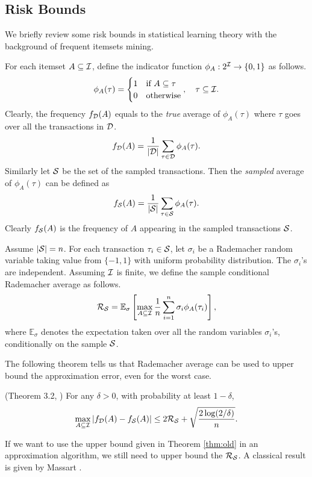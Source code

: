 \documentclass{article}
\begin{document}
\subsection{Risk Bounds}
\label{sec:rb}
\newcommand{\R}{\mathcal{R}}
We briefly review some risk bounds in statistical learning theory \cite{BBL05} with the background of frequent itemsets mining. 

For each itemset $A\subseteq\mathcal{I}$, define the indicator function $\phi_A : 2^{\mathcal{I}} \to \{0, 1\}$ as follows.
$$\phi_A(\tau) = \begin{cases}
1 & \textrm{if $A\subseteq \tau$}\\
0 & \textrm{otherwise}\\
\end{cases},\quad
\tau\subseteq\mathcal{I}.$$
Clearly, the frequency $f_{\mathcal{D}}(A)$ equals to the \emph{true} average of $\phi_A(\tau)$ where $\tau$ goes over all the transactions in $\mathcal{D}$.
$$f_{\mathcal{D}}(A) = \frac{1}{|\mathcal{D}|} \sum_{\tau\in\mathcal{D}} \phi_A(\tau).$$
Similarly let $\mathcal{S}$ be the set of the sampled transactions. Then the \emph{sampled} average of $\phi_A(\tau)$ can be defined as
$$f_{\mathcal{S}}(A) = \frac{1}{|\mathcal{S}|} \sum_{\tau\in\mathcal{S}} \phi_A(\tau).$$
Clearly $f_{\mathcal{S}}(A)$ is the frequency of $A$ appearing in the sampled transactions $\mathcal{S}$.

Assume $|\mathcal{S}| = n$. For each transaction $\tau_i \in \mathcal{S}$, let $\sigma_i$ be a Rademacher random variable taking value from $\{-1, 1\}$ with uniform probability distribution. The $\sigma_i$'s are independent. Assuming $\mathcal{I}$ is finite, we define the sample conditional Rademacher average as follows.
$$\R_\Smp = \mathbb{E}_\sigma \left[\max_{A\subseteq\I}\frac{1}{n}\sum_{i=1}^n \sigma_i\phi_A(\tau_i)\right],$$
where $\mathbb{E}_\sigma$ denotes the expectation taken over all the random variables $\sigma_i$'s, conditionally on the sample $\mathcal{S}$. 

The following theorem tells us that Rademacher average can be used to upper bound the approximation error, even for the worst case.

\begin{theorem}
\label{thm:old}
(Theorem 3.2, \cite{BBL05}) For any $\delta>0$, with probability at least $1-\delta$,
$$\max_{A\subseteq\I} |f_\D(A) - f_\Smp(A)|\leq 2\R_\Smp + \sqrt{\frac{2\log(2/\delta)}{n}}.$$
\end{theorem}

If we want to use the upper bound given in Theorem \ref{thm:old} in an approximation algorithm, we still need to upper bound the $\R_\Smp$. A classical result is given by Massart \cite{Mas00}.
\end{document}
